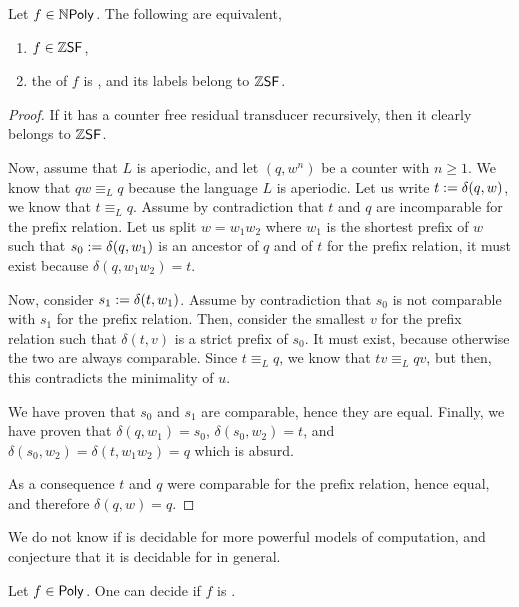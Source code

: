 \begin{conjecture}
    Let $f \in \NPoly$. The following are equivalent,
    \begin{enumerate}
        \item $f \in \ZSF$,
        \item the  of $f$
            is ,
            and its labels belong to $\ZSF$.
    \end{enumerate}
\end{conjecture}
\begin{proof}
    If it has a counter free residual transducer recursively, then
    it clearly belongs to $\ZSF$.


    Now, assume that $L$ is aperiodic, and let $(q,w^n)$ be a counter with $n
    \geq 1$. We know that $qw \equiv_L q$ because the language $L$ is
    aperiodic. Let us write $t \mathrel{:=} \delta(q,w)$, we know that $t \equiv_L
    q$. Assume by contradiction that $t$ and $q$ are incomparable for the
    prefix relation. Let us split $w = w_1 w_2$ where $w_1$ is the shortest
    prefix of $w$ such that $s_0 \mathrel{:=} \delta(q,w_1)$ is an ancestor of $q$
    and of $t$ for the prefix relation, it must exist because $\delta(q,w_1
    w_2) = t$.

    Now, consider $s_1 \mathrel{:=} \delta(t, w_1)$. Assume by contradiction that
    $s_0$ is not comparable with $s_1$ for the prefix relation. Then, consider
    the smallest $v$ for the prefix relation such that $\delta(t, v)$ is a
    strict prefix of $s_0$. It must exist, because otherwise the two are always
    comparable. Since $t \equiv_L q$, we know that $tv \equiv_L qv$, but then,
    this contradicts the minimality of $u$.

    We have proven that $s_0$ and $s_1$ are comparable, hence they
    are equal.
    Finally, we have proven that $\delta(q, w_1) = s_0$,
    $\delta(s_0, w_2) = t$, and $\delta(s_0, w_2) = \delta(t, w_1w_2) = q$ which is absurd.

    As a consequence $t$ and $q$ were comparable for the prefix relation,
    hence equal, and therefore $\delta(q, w) = q$.
\end{proof}

We do not know if  is decidable for more powerful models of
computation, and conjecture that it is decidable for 
in general.

\begin{conjecture}
    Let $f \in \Poly$. One can decide if $f$ is .
\end{conjecture}
